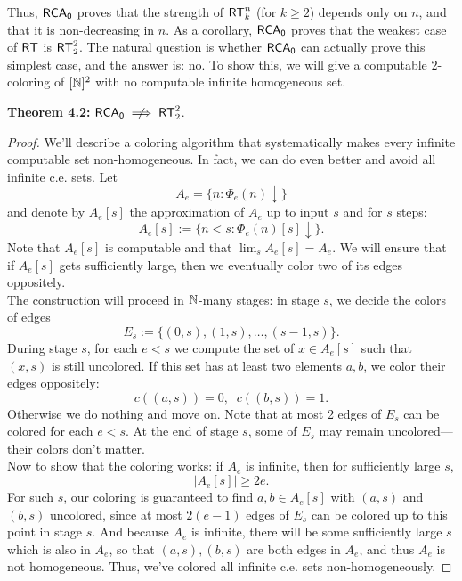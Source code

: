 \documentclass{amsart}
\begin{document}
	Thus, $\operatorname{\sf{RCA_0}}$ proves that the strength of $\operatorname{\sf{RT}}^n_k$ (for $k\geq 2$) depends only on $n$, and that it is non-decreasing in $n$. As a corollary, $\operatorname{\sf{RCA_0}}$ proves that the weakest case of $\operatorname{\sf{RT}}$ is $\operatorname{\sf{RT}}^2_2$. The natural question is whether $\operatorname{\sf{RCA_0}}$ can actually prove this simplest case, and the answer is: no. To show this, we will give a computable $2$-coloring of $[\mathbb{N}]^2$ with no computable infinite homogeneous set.\\
	
	\newpage 
	
	\noindent \textbf{Theorem 4.2:} $\RCA\centernot\implies \RT^2_2$.
	\begin{proof} We'll describe a coloring algorithm that systematically makes every infinite computable set non-homogeneous. In fact, we can do even better and avoid all infinite c.e. sets. Let
		$$A_e = \{n:\Phi_e(n)\downarrow\}$$
		and denote by $A_e[s]$ the approximation of $A_e$ up to input $s$ and for $s$ steps:
		$$A_{e}[s] := \{n< s : \Phi_e(n)[s]\downarrow\}.$$
		Note that $A_e[s]$ is computable and that $\lim_s A_e[s] = A_e$. We will ensure that if $A_e[s]$ gets sufficiently large, then we eventually color two of its edges oppositely.\\
		
		The construction will proceed in $\mathbb{N}$-many stages: in stage $s$, we decide the colors of edges 
		$$E_s := \{(0,s),(1,s),\dots,(s-1,s)\}.$$
		During stage $s$, for each $e<s$ we compute the set of $x\in A_e[s]$ such that $(x,s)$ is still uncolored. If this set has at least two elements $a,b$, we color their edges oppositely:
		$$
		c((a,s)) = 0, \;\; c((b,s))=1.
		$$
		Otherwise we do nothing and move on. Note that at most 2 edges of $E_s$ can be colored for each $e<s$. At the end of stage $s$, some of $E_s$ may remain uncolored---their colors don't matter.\\
		
		Now to show that the coloring works: if $A_e$ is infinite, then for sufficiently large $s$, 
		$$|A_e[s]|\geq 2e.$$ 
		For such $s$, our coloring is guaranteed to find $a,b\in A_e[s]$ with $(a,s)$ and $(b,s)$ uncolored, since at most $2(e-1)$ edges of $E_s$ can be colored up to this point in stage $s$. And because $A_e$ is infinite, there will be some sufficiently large $s$ which is also in $A_e$, so that $(a,s),(b,s)$ are both edges in $A_e$, and thus $A_e$ is not homogeneous. Thus, we've colored all infinite c.e. sets non-homogeneously.
	\end{proof}\\
	
\end{document}
